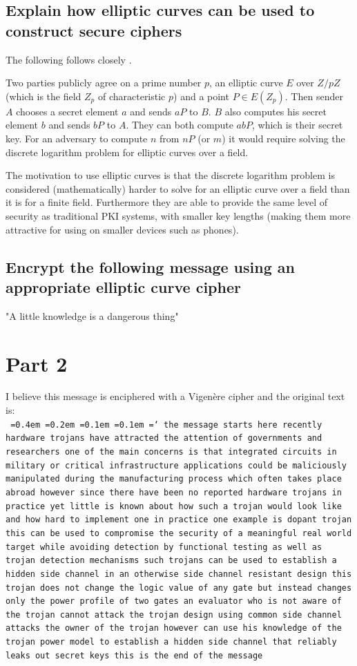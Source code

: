 \documentclass[12pt,a4paper,onecolumn]{article}
\newcommand*\justify{%
  \fontdimen2\font=0.4em%
  \fontdimen3\font=0.2em%
  \fontdimen4\font=0.1em%
  \fontdimen7\font=0.1em%
  \hyphenchar\font=`\-%
}
\begin{document}
\subsection{Explain how elliptic curves can be used to construct secure ciphers}
The following follows closely \citep{book:ent}.

Two parties publicly agree on a prime number $p$, an elliptic curve $E$ over $Z/pZ$ (which is the field $Z_p$ of characteristic $p$) and a point $P\in E(Z_p)$. Then sender $A$ chooses a secret element $a$ and sends $aP$ to  $B$. $B$ also computes his secret element $b$ and sends $bP$ to $A$. They can both compute $abP$, which is their secret key. For an adversary to compute $n$ from $nP$ (or $m$) it would require solving the discrete logarithm problem for elliptic curves over a field.

The motivation to use elliptic curves is that the discrete logarithm problem is considered (mathematically) harder to solve for an elliptic curve over a field than it is for a finite field. Furthermore they are able to provide the same level of security as traditional PKI systems, with smaller key lengths (making them more attractive for using on smaller devices such as phones).\\

\subsection{Encrypt the following message using an appropriate elliptic curve cipher}
"A little knowledge is a dangerous thing"\\

\section{Part 2}
I believe this message is enciphered with a Vigenère cipher and the original text is:\\

\texttt{\justify the message starts here recently hardware trojans have attracted the attention of governments and researchers one of the main concerns is that integrated circuits in military or critical infrastructure applications could be maliciously manipulated during the manufacturing process which often takes place abroad however since there have been no reported hardware trojans in practice yet little is known about how such a trojan would look like and how hard to implement one in practice one example is dopant trojan this can be used to compromise the security of a meaningful real world target while avoiding detection by functional testing as well as trojan detection mechanisms such trojans can be used to establish a hidden side channel in an otherwise side channel resistant design this trojan does not change the logic value of any gate but instead changes only the power profile of two gates an evaluator who is not aware of the trojan cannot attack the trojan design using common side channel attacks the owner of the trojan however can use his knowledge of the trojan power model to establish a hidden side channel that reliably leaks out secret keys this is the end of the message}\\
\end{document}
